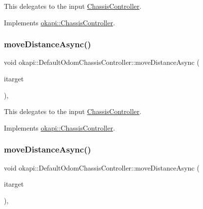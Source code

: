 This delegates to the input \mbox{\hyperlink{classokapi_1_1ChassisController}{Chassis\+Controller}}. 

Implements \mbox{\hyperlink{classokapi_1_1ChassisController_a58619e777fd1b3f8e1aae871d46a8ccf}{okapi\+::\+Chassis\+Controller}}.

\mbox{\label{classokapi_1_1DefaultOdomChassisController_a61ca0d303fcbfd08932157af9adbbb12}} 
\subsubsection{\texorpdfstring{moveDistanceAsync()}{moveDistanceAsync()}\hspace{0.1cm}{\footnotesize\ttfamily [1/2]}}
{\footnotesize\ttfamily void okapi\+::\+Default\+Odom\+Chassis\+Controller\+::move\+Distance\+Async (\begin{DoxyParamCaption}\item[{Q\+Length}]{itarget }\end{DoxyParamCaption})\hspace{0.3cm}{\ttfamily [override]}, {\ttfamily [virtual]}}

This delegates to the input \mbox{\hyperlink{classokapi_1_1ChassisController}{Chassis\+Controller}}. 

Implements \mbox{\hyperlink{classokapi_1_1ChassisController_a67a17268b871a4f1ae74d67891cbf5dd}{okapi\+::\+Chassis\+Controller}}.

\mbox{\label{classokapi_1_1DefaultOdomChassisController_ab1abaec33ecce2515895d3a8af363c8c}} 
\subsubsection{\texorpdfstring{moveDistanceAsync()}{moveDistanceAsync()}\hspace{0.1cm}{\footnotesize\ttfamily [2/2]}}
{\footnotesize\ttfamily void okapi\+::\+Default\+Odom\+Chassis\+Controller\+::move\+Distance\+Async (\begin{DoxyParamCaption}\item[{double}]{itarget }\end{DoxyParamCaption})\hspace{0.3cm}{\ttfamily [override]}, {\ttfamily [virtual]}}

